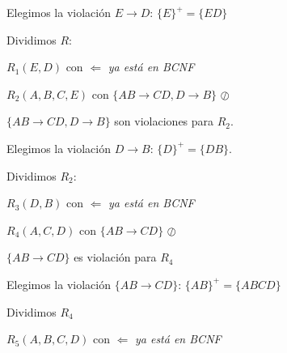 \documentclass[12pt, letterpaper]{article}
\begin{document}
\begin{itemize}
\begin{itemize}
\begin{itemize}
                                            Elegimos la violación $E \rightarrow D$: $\{E\}^+=\{ED\}$\vspace{.3cm}
                                            
                                            Dividimos $R$: \vspace{.2cm}

                                            $R_{1}(E,D)$ con  \checkmark  $\Leftarrow$ \textit{ya está en BCNF} \vspace{.1cm}

                                            $R_{2}(A,B,C,E)$ con $\{AB \rightarrow CD, D \rightarrow B\}$ $\oslash$ \vspace{.3cm}

                                            $\{AB \rightarrow CD, D \rightarrow B\}$ son violaciones para $R_{2}$.\vspace{.3cm}

                                            Elegimos la violación $D \rightarrow B$: $\{D\}^+=\{DB\}$.\vspace{.3cm}

                                            Dividimos $R_{2}$:\vspace{.2cm}

                                            $R_{3}(D,B)$ con  \checkmark $\Leftarrow$ \textit{ya está en BCNF} \vspace{.1cm}

                                            $R_{4}(A,C,D)$ con $\{AB \rightarrow CD\}$ $\oslash$\vspace{.3cm}

                                            $\{AB \rightarrow CD\}$ es violación para $R_{4}$ \vspace{.3cm}

                                            Elegimos la violación $\{AB \rightarrow CD\}$: $\{AB\}^+=\{ABCD\}$\vspace{.3cm}

                                            Dividimos $R_{4}$\vspace{.2cm}

                                            $R_{5}(A,B,C,D)$ con  \checkmark $\Leftarrow$ \textit{ya está en BCNF} \vspace{.1cm}


\end{itemize}
\end{itemize}
\end{itemize}
\end{document}
